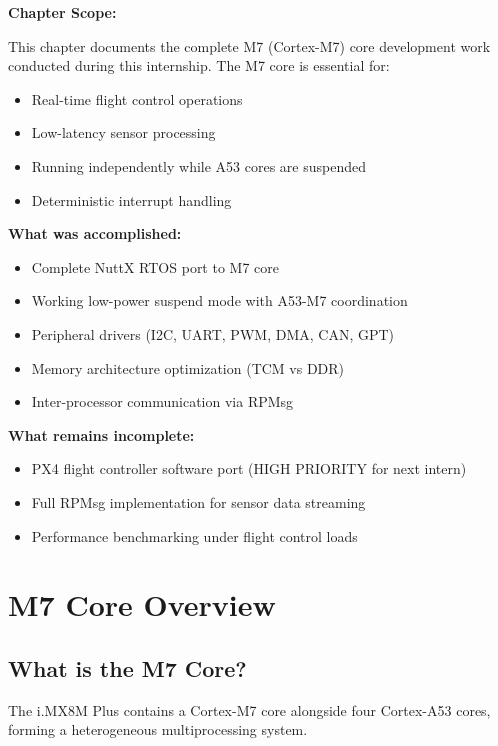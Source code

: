 \documentclass[12pt,a4paper]{report}
\begin{document}
\begin{important}
\textbf{Chapter Scope:}

This chapter documents the complete M7 (Cortex-M7) core development work conducted during this internship. The M7 core is essential for:
\begin{itemize}
    \item Real-time flight control operations
    \item Low-latency sensor processing
    \item Running independently while A53 cores are suspended
    \item Deterministic interrupt handling
\end{itemize}

\textbf{What was accomplished:}
\begin{itemize}
    \item Complete NuttX RTOS port to M7 core
    \item Working low-power suspend mode with A53-M7 coordination
    \item Peripheral drivers (I2C, UART, PWM, DMA, CAN, GPT)
    \item Memory architecture optimization (TCM vs DDR)
    \item Inter-processor communication via RPMsg
\end{itemize}

\textbf{What remains incomplete:}
\begin{itemize}
    \item PX4 flight controller software port (HIGH PRIORITY for next intern)
    \item Full RPMsg implementation for sensor data streaming
    \item Performance benchmarking under flight control loads
\end{itemize}
\end{important}

\section{M7 Core Overview}

\subsection{What is the M7 Core?}

The i.MX8M Plus contains a Cortex-M7 core alongside four Cortex-A53 cores, forming a heterogeneous multiprocessing system.
\end{document}

